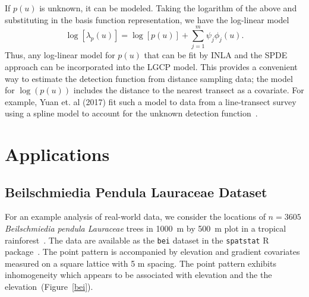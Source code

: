 \documentclass[]{interact}
\begin{document}
If \(p(u)\) is unknown, it can be modeled. Taking the logarithm of
the above and substituting in the basis function representation, we have the
log-linear model
\begin{displaymath}
\log\left[\lambda_{p}(u)\right]
= \log\left[p(u)\right] + \sum_{j = 1}^{m} \psi_{j} \phi_{j}(u).
\end{displaymath}
Thus, any log-linear model for \(p(u)\) that can be fit by INLA and the SPDE
approach can be incorporated into the LGCP model. This provides a convenient
way to estimate the detection function from distance sampling data; the model
for \(\log(p(u))\) includes the distance to the nearest transect as a
covariate. For example, Yuan et. al (2017) fit such a model to data from a
line-transect survey using a spline model to account for the unknown detection
function~\cite{yuanetal}.


\section{Applications}
\label{application}











\subsection{Beilschmiedia Pendula Lauraceae Dataset}
\label{beianalysis}

For an example analysis of real-world data, we consider the locations of
\(n = 3605\) \emph{Beilschmiedia pendula Lauraceae} trees in 1000~m by 500~m
plot in a tropical rainforest~\cite{moellerwaagepetersen}. The data are
available as the \texttt{bei} dataset in the \texttt{spatstat} R
package~\cite{spatstat}. The point pattern is accompanied by elevation and
gradient covariates measured on a square lattice with 5 m spacing. The point
pattern exhibits inhomogeneity which appears to be associated with elevation
and the the elevation~(Figure~\ref{bei}).
\end{document}
